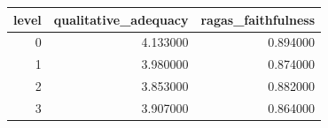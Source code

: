 \begin{tabular}{rrr}
\toprule
level & qualitative_adequacy & ragas_faithfulness \\
\midrule
0 & 4.133000 & 0.894000 \\
1 & 3.980000 & 0.874000 \\
2 & 3.853000 & 0.882000 \\
3 & 3.907000 & 0.864000 \\
\bottomrule
\end{tabular}
